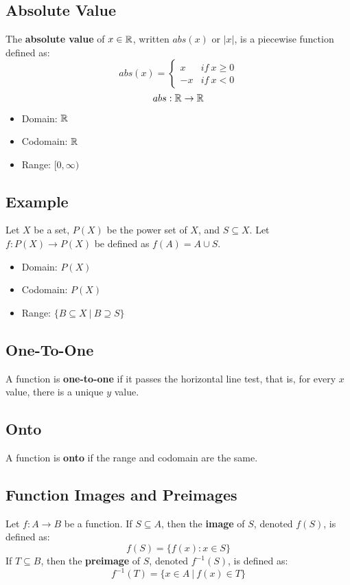 \documentclass[letterpaper, 12pt]{math}
\begin{document}
\subsection*{Absolute Value}
The \textbf{absolute value} of \( x\in\mathbb{R} \), written \( abs(x) \) or \( |x| \),
is a piecewise function defined as:
\[ abs(x) =
  \begin{cases}
    x & if\ x\geq 0 \\
    -x & if\ x < 0
  \end{cases}
\]
\[ abs:\mathbb{R}\to\mathbb{R} \]
\begin{itemize}
  \item Domain: \( \mathbb{R} \)
  \item Codomain: \( \mathbb{R} \)
  \item Range: \( [0,\infty) \)
\end{itemize}

\subsection*{Example}
Let \( X \) be a set, \( P(X) \) be the power set of \( X \), and
\( S \subseteq X \). Let \( f:P(X)\to P(X) \) be defined as
\( f(A) = A \cup S \).
\begin{itemize}
  \item Domain: \( P(X) \)
  \item Codomain: \( P(X) \)
  \item Range: \( \{B \subseteq X\ |\ B \supseteq S\} \)
\end{itemize}

\subsection*{One-To-One}
A function is \textbf{one-to-one} if it passes the horizontal line test, that
is, for every \( x \) value, there is a unique \( y \) value.

\subsection*{Onto}
A function is \textbf{onto} if the range and codomain are the same.

\subsection*{Function Images and Preimages}
Let \( f:A\to B \) be a function. If \( S \subseteq A \), then the
\textbf{image} of \( S \), denoted \( f(S) \), is defined as:
\[ f(S) = \{f(x):x\in S \} \]
If \( T \subseteq B \), then the \textbf{preimage} of \( S \), denoted
\( f^{-1}(S) \), is defined as:
\[ f^{-1}(T) = \{x\in A\ |\ f(x)\in T\} \]
\end{document}
